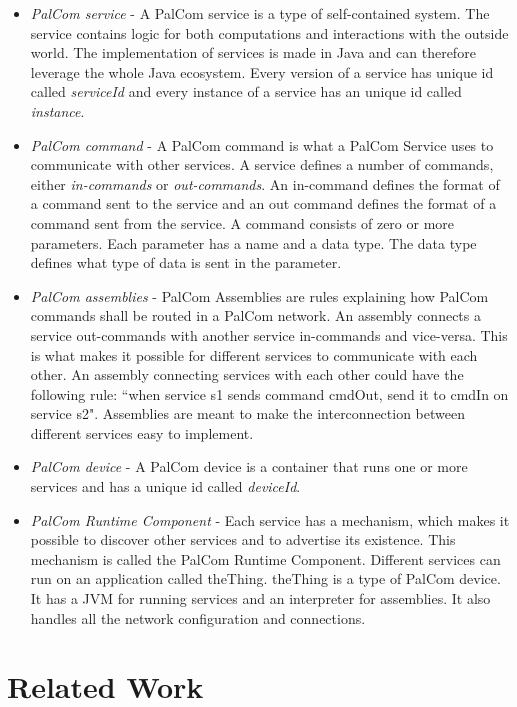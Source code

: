 \documentclass{cslthse-msc}
\begin{document}
\begin{itemize}
\item \emph{PalCom service} - A PalCom service is a type of self-contained system. The service contains logic for both computations and interactions with the outside world. The implementation of services is made in Java and can therefore leverage the whole Java ecosystem. Every version of a service has unique id called \emph{serviceId} and every instance of a service has an unique id called \emph{instance}. 


\item \emph{PalCom command} - A PalCom command is what a PalCom Service uses to communicate with other services. A service defines a number of commands, either \emph{in-commands} or \emph{out-commands}. An in-command defines the format of a command sent to the service and an out command defines the format of a command sent from the service. A command consists of zero or more parameters. Each parameter has a name and a data type. The data type defines what type of data is sent in the parameter. 

\item \emph{PalCom assemblies} - PalCom Assemblies are rules explaining how PalCom commands shall be routed in a PalCom network. An assembly connects a service out-commands with another service in-commands and vice-versa. This is what makes it possible for different services to communicate with each other. An assembly connecting services with each other could have the following rule:  “when service s1 sends command cmdOut, send it to cmdIn on service s2". Assemblies are meant to make the interconnection between different services easy to implement.

\item \emph{PalCom device} - A PalCom device is a container that runs one or more services and has a unique id called \emph{deviceId}.

\item \emph{PalCom Runtime Component} - Each service has a mechanism, which makes it possible to discover other services and to advertise its existence. This mechanism is called the PalCom Runtime Component. Different services can run on an application called theThing. theThing is a type of PalCom device. It has a JVM for running services and an interpreter for assemblies. It also handles all the network configuration and connections.

\end{itemize}


\chapter[Related Work]{Related Work}
\end{document}
